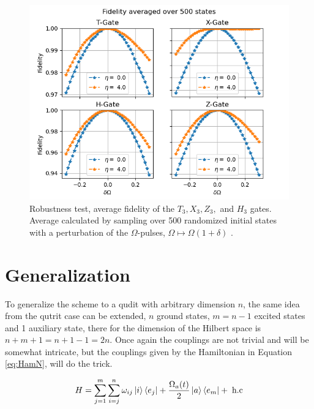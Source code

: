 \begin{figure}[H]
\includegraphics[scale=1]{figures/Fid500.png}

\caption{Robustness test, average fidelity of the $T_3,X_3,Z_3,$ and $H_3$ gates. Average calculated by sampling over 500 randomized initial states with a perturbation of the $\Omega$-pulses, $\Omega \mapsto \Omega(1+\delta)$ .}
\label{fig:fidelity}
\end{figure}


\newpage
\section{Generalization}
To generalize the scheme to a qudit with arbitrary dimension $n$,  the same idea from the qutrit case can be extended, $n$ ground states, $m = n - 1$ excited states and 1 auxiliary state, there for the dimension of the Hilbert space is  $n + m + 1 = n + 1 -1 = 2n$. Once again the couplings are not trivial and will be somewhat intricate, but the couplings given by the Hamiltonian in Equation \ref{eq:HamN}, will do the trick. 

\begin{equation}
H = \sum_{j = 1}^m \sum_{i = j}^n \omega_{ij} \ket{i}\bra{e_j} + \frac{\Omega_a(t)}{2}\ket{a}\bra{e_m} +\;\text{h.c}
\label{eq:HamN}
\end{equation}

